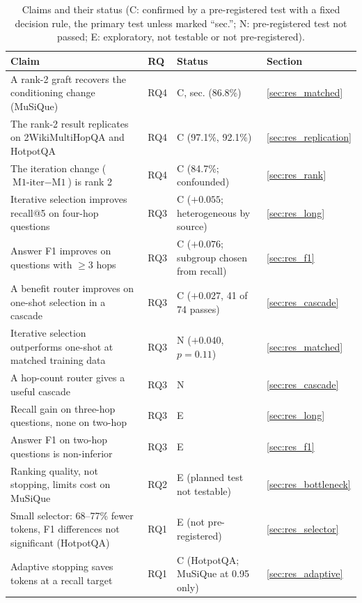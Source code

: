\begin{table}[htbp]
\centering
\caption{Claims and their status (C: confirmed by a pre-registered test with a fixed decision rule, the primary test unless marked ``sec.''; N: pre-registered test not passed; E: exploratory, not testable or not pre-registered).}
\label{tab:claims}
\small
\begin{tabularx}{\textwidth}{>{\raggedright\arraybackslash}Xl>{\raggedright\arraybackslash}p{3.6cm}l}
\toprule
Claim & RQ & Status & Section \\
\midrule
A rank-2 graft recovers the conditioning change (MuSiQue) & RQ4 & C, sec. (86.8\%) & \ref{sec:res_matched} \\
The rank-2 result replicates on 2WikiMultiHopQA and HotpotQA & RQ4 & C (97.1\%, 92.1\%) & \ref{sec:res_replication} \\
The iteration change ($\text{M1-iter}-\text{M1}$) is rank 2 & RQ4 & C (84.7\%; confounded) & \ref{sec:res_rank} \\
Iterative selection improves recall@5 on four-hop questions & RQ3 & C ($+0.055$; heterogeneous by source) & \ref{sec:res_long} \\
Answer F1 improves on questions with $\ge$3 hops & RQ3 & C ($+0.076$; subgroup chosen from recall) & \ref{sec:res_f1} \\
A benefit router improves on one-shot selection in a cascade & RQ3 & C ($+0.027$, 41 of 74 passes) & \ref{sec:res_cascade} \\
Iterative selection outperforms one-shot at matched training data & RQ3 & N ($+0.040$, $p=0.11$) & \ref{sec:res_matched} \\
A hop-count router gives a useful cascade & RQ3 & N & \ref{sec:res_cascade} \\
Recall gain on three-hop questions, none on two-hop & RQ3 & E & \ref{sec:res_long} \\
Answer F1 on two-hop questions is non-inferior & RQ3 & E & \ref{sec:res_f1} \\
Ranking quality, not stopping, limits cost on MuSiQue & RQ2 & E (planned test not testable) & \ref{sec:res_bottleneck} \\
Small selector: 68--77\% fewer tokens, F1 differences not significant (HotpotQA) & RQ1 & E (not pre-registered) & \ref{sec:res_selector} \\
Adaptive stopping saves tokens at a recall target & RQ1 & C (HotpotQA; MuSiQue at 0.95 only) & \ref{sec:res_adaptive} \\
\bottomrule
\end{tabularx}
\end{table}
